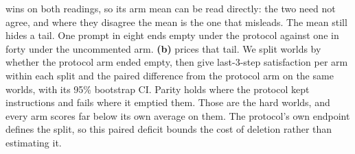 \begin{table}[t]
{    wins on both readings, so its arm mean can be read directly: the two need not agree, and where
    they disagree the mean is the one that misleads. The mean still hides a tail. One prompt in
    eight ends empty under the protocol against one in forty under the uncommented arm.
    \textbf{(b)} prices that tail. We split worlds by whether the protocol arm ended empty, then
    give last-3-step satisfaction per arm within each split and the paired difference from the
    protocol arm on the same worlds, with its 95\% bootstrap CI. Parity holds where the protocol
    kept instructions and fails where it emptied them. Those are the hard worlds, and every arm
    scores far below its own average on them. The protocol's own endpoint defines the split, so
    this paired deficit bounds the cost of deletion rather than estimating it.
  }
  \label{tab:calibration}
\end{table}
